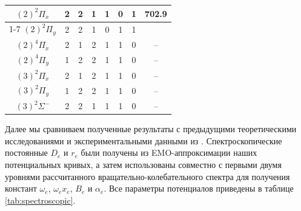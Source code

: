 \documentclass[12pt]{extarticle}
\begin{document}
\begin{table}[H]
\begin{tabular}{|c|cccccc|c|}
    		$(2)^2 \Pi_x$              & 2                                       & 2                                       & 1                                       & 1                                      & 0                                      & 1                 & 702.9            \\ \cline{1-7}
    		$(2)^2 \Pi_y$              & 2                                       & 2                                       & 1                                       & 0                                      & 1                                      & 1                 &                  \\ \hline
    		$(2)^4\Pi_x$               & 2                                       & 1                                       & 2                                       & 1                                      & 1                                      & 0                 & --               \\ \hline
    		$(2)^4\Pi_y$               & 1                                       & 2                                       & 2                                       & 1                                      & 1                                      & 0                 & --               \\ \hline
    		$(3)^2\Pi_x$               & 2                                       & 1                                       & 2                                       & 1                                      & 1                                      & 0                 & --               \\ \hline
    		$(3)^2\Pi_y$               & 1                                       & 2                                       & 2                                       & 1                                      & 1                                      & 0                 & --               \\ \hline
    		$(3)^2\Sigma^-$            & 2                                       & 2                                       & 1                                       & 1                                      & 1                                      & 0                 & --               \\ \hline
    	\end{tabular}
    \end{table}
    
    Далее мы сравниваем полученные результаты с предыдущими теоретическими исследованиями и экспериментальными данными из \cite{hillier}. Спектроскопические постоянные $D_e$ и $r_e$ были получены из EMO-аппроксимации наших потенциальных кривых, а затем использованы совместно с первыми двумя уровнями рассчитанного вращательно-колебательного спектра для получения констант $\omega_e$, $\omega_e x_e$, $B_e$ и $\alpha_e$. Все параметры потенциалов приведены в таблице \ref{tab:spectroscopic}. 
    
\end{document}
